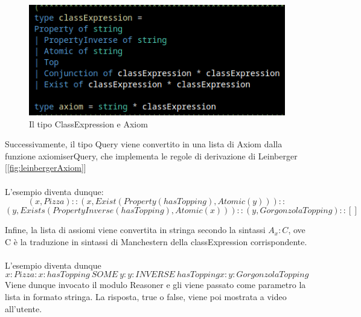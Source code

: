 \begin{figure}[H]
    \centering
    \includegraphics[width=\textwidth]{pictures/classExpressionType.png}
    \caption{Il tipo ClassExpression e Axiom}
    \label{fig:enter-label}
\end{figure}
Successivamente, il tipo Query viene convertito in una lista di Axiom dalla funzione axiomiserQuery, che implementa le regole di derivazione di Leinberger [\ref{fig:leinbergerAxiom}]\\ \\L'esempio diventa dunque:
\[ (x, Pizza) :: (x, Exist(Property(hasTopping),Atomic(y))) :: \]\[ (y, Exists(PropertyInverse(hasTopping), Atomic(x))) ::
      (y, GorgonzolaTopping) :: []
 \]
        
Infine, la lista di assiomi viene convertita in stringa secondo la sintassi \(A_{x} : C\), ove C è la traduzione in sintassi di Manchestern della classExpression corrispondente. 
\\\\ L'esempio diventa dunque
\[ x : Pizza : x : hasTopping \ SOME \ y : y : INVERSE \ hasTopping x : y : GorgonzolaTopping\]
Viene dunque invocato il modulo Reasoner e gli viene passato come parametro la lista in formato stringa. La risposta, true o false, viene poi mostrata a video all'utente. 
    
